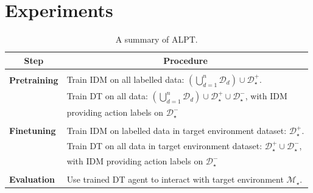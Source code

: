 \documentclass{article} %
\begin{document}
\section{Experiments}

\begin{table}[t]
\caption{A summary of ALPT.}
\label{tab:data}
\begin{center}
\begin{tabular}{ll}
\multicolumn{1}{c}{\bf Step} & 
\multicolumn{1}{c}{\bf Procedure} 
\\ \hline \\
\textbf{Pretraining} & Train IDM on all labelled data: $\left(\bigcup_{d=1}^n \mathcal{D}_d\right)\cup\mathcal{D}^+_\star$. \\
& Train DT on all data: $\left(\bigcup_{d=1}^n \mathcal{D}_d\right)\cup\mathcal{D}^+_\star\cup\mathcal{D}^-_\star$, with IDM \\
& providing action labels on $\mathcal{D}^-_\star$ 
\\ \hline \\
\textbf{Finetuning}             & 
Train IDM on labelled data in target environment dataset: $\mathcal{D}^+_\star$. \\ 
& Train DT on all data in target environment dataset: $\mathcal{D}^+_\star\cup\mathcal{D}^-_\star$, \\
& with IDM providing action labels on $\mathcal{D}^-_\star$ 
\\ \hline \\
\textbf{Evaluation}             & 
Use trained DT agent to interact with target environment $\mathcal{M}_\star$. \\
\end{tabular}
\end{center}
\end{table}
\end{document}
